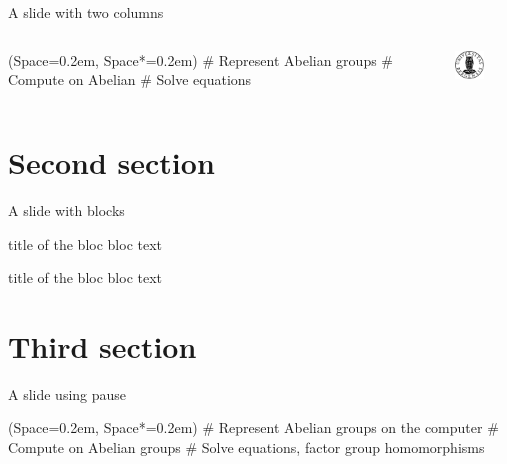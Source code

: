 \documentclass[12pt, aspectratio=149]{beamer}
\newcommand{\listSpace}{0.2em}
\theoremstyle{plain}
\begin{document}
\begin{frame}[fragile]{A slide with two columns}
\begin{columns}
\begin{column}{0.5\textwidth}
	\begin{easylist}[itemize]
		\ListProperties(Space=\listSpace, Space*=\listSpace)
		# Represent Abelian groups
		# Compute on Abelian
		# Solve equations
	\end{easylist}
\end{column}
\begin{column}{0.5\textwidth}
    \begin{center}
     \includegraphics[width=0.5\textwidth]{figs/UiB_logo.pdf}
     \end{center}
\end{column}
\end{columns}
\end{frame}

\section{Second section}
\begin{frame}[fragile]{A slide with blocks}
	\begin{block}{title of the bloc}
	bloc text
	\end{block}
	
	\begin{exampleblock}{title of the bloc}
	bloc text
	\end{exampleblock}
\end{frame}

\section{Third section}
\begin{frame}[fragile]{A slide using pause}
	\begin{easylist}[itemize]
		\ListProperties(Space=\listSpace, Space*=\listSpace)
		# Represent Abelian groups on the computer \pause
		# Compute on Abelian groups \pause
		# Solve equations, factor group homomorphisms
	\end{easylist}
\end{frame}
\end{document}
